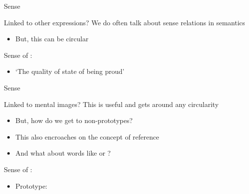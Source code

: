 \documentclass{beamer}
\newcommand{\subtwoone}{Sense}
\begin{document}
      \begin{frame}[t]{\subtwoone}
        \begin{block}{Linked to other expressions?}
          We do often talk about sense relations in semantics
          \begin{itemize}
            \item<2-> But, this can be circular
          \end{itemize}
        \end{block}
        \begin{example}
          Sense of :
          \begin{itemize}
            \item `The quality of state of being proud'
          \end{itemize}
        \end{example}
      \end{frame}

      \begin{frame}[t]{\subtwoone}
        \begin{block}{Linked to mental images?}
          This is useful and gets around any circularity
          \begin{itemize}
            \item<3-> But, how do we get to non-prototypes?
            \item<5-> This also encroaches on the concept of reference
            \item<6-> And what about words like  or ?
          \end{itemize}
        \end{block}
        \begin{example}
          \parbox{0.48\linewidth}{
            Sense of :
            \begin{itemize}
              \item<2-> \alert{Prototype}: 
            \end{itemize}
          }
          \parbox{0.48\linewidth}{
          }
        \end{example}
      \end{frame}
\end{document}
